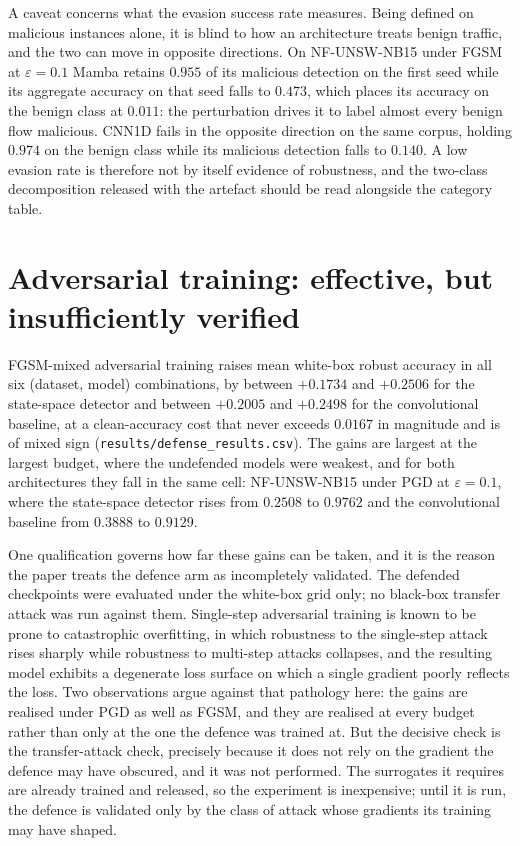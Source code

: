 \documentclass[11pt,a4paper]{article}
\begin{document}
A caveat concerns what the evasion success rate measures. Being defined
on malicious instances alone, it is blind to how an architecture treats
benign traffic, and the two can move in opposite directions. On
NF-UNSW-NB15 under FGSM at $\varepsilon=0.1$ Mamba retains $0.955$ of
its malicious detection on the first seed while its aggregate accuracy
on that seed falls to $0.473$, which places its accuracy on the benign
class at $0.011$: the perturbation drives it to label almost every
benign flow malicious. CNN1D fails in the opposite direction on the
same corpus, holding $0.974$ on the benign class while its malicious
detection falls to $0.140$. A low evasion rate is therefore not by
itself evidence of robustness, and the two-class decomposition released
with the artefact should be read alongside the category table.

\section{Adversarial training: effective, but insufficiently verified}
\label{sup:defence}

FGSM-mixed adversarial training raises mean white-box robust accuracy
in all six (dataset, model) combinations, by between $+0.1734$ and
$+0.2506$ for the state-space detector and between $+0.2005$ and
$+0.2498$ for the convolutional baseline, at a clean-accuracy cost that
never exceeds $0.0167$ in magnitude and is of mixed sign
(\texttt{results/defense\_results.csv}). The gains are largest at the
largest budget, where the undefended models were weakest, and for both
architectures they fall in the same cell: NF-UNSW-NB15 under PGD at
$\varepsilon=0.1$, where the state-space detector rises from $0.2508$
to $0.9762$ and the convolutional baseline from $0.3888$ to $0.9129$.

One qualification governs how far these gains can be taken, and it is
the reason the paper treats the defence arm as incompletely validated.
The defended checkpoints were evaluated under the white-box grid only;
no black-box transfer attack was run against them. Single-step
adversarial training is known to be prone to catastrophic overfitting,
in which robustness to the single-step attack rises sharply while
robustness to multi-step attacks collapses, and the resulting model
exhibits a degenerate loss surface on which a single gradient poorly
reflects the loss. Two observations argue against that pathology here:
the gains are realised under PGD as well as FGSM, and they are realised
at every budget rather than only at the one the defence was trained at.
But the decisive check is the transfer-attack check, precisely because
it does not rely on the gradient the defence may have obscured, and it
was not performed. The surrogates it requires are already trained and
released, so the experiment is inexpensive; until it is run, the
defence is validated only by the class of attack whose gradients its
training may have shaped.
\end{document}
